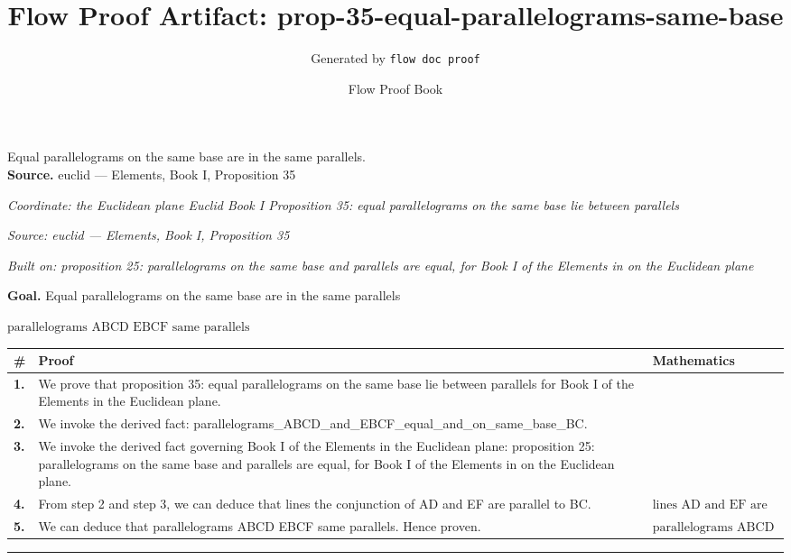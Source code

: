 \documentclass[11pt]{article}
\title{Flow Proof Artifact: prop-35-equal-parallelograms-same-base}
\author{Generated by \texttt{flow doc proof}}
\date{Flow Proof Book}
\theoremstyle{definition}
\begin{document}
\maketitle
Equal parallelograms on the same base are in the same parallels.\\[0.5em]
\textbf{Source.} euclid — Elements, Book I, Proposition 35\\[0.5em]
\bigskip
{}\par
\smallskip\noindent\textit{Coordinate: the Euclidean plane \cdot Euclid Book I \cdot Proposition 35: equal parallelograms on the same base lie between parallels}\par
\smallskip\noindent\textit{Source: euclid — Elements, Book I, Proposition 35}\par
\smallskip\noindent\textit{Built on: proposition 25: parallelograms on the same base and parallels are equal, for Book I of the Elements in on the Euclidean plane}\par
\medskip
\noindent\textbf{Goal.} Equal parallelograms on the same base are in the same parallels\par
\noindent$\displaystyle \text{parallelograms ABCD EBCF same parallels}$\par
\medskip
\noindent
\begin{tabular}{@{} >{\raggedright\arraybackslash}p{} >{\raggedright\arraybackslash}p{} >{\raggedleft\arraybackslash}p{} @{}}
\textbf{\#} & \textbf{Proof} & \textbf{Mathematics} \\
\midrule
\textbf{1.} & We prove that proposition 35: equal parallelograms on the same base lie between parallels for Book I of the Elements in the Euclidean plane. & \\[0.45em]
\textbf{2.} & We invoke the derived fact: parallelograms\_ABCD\_and\_EBCF\_equal\_and\_on\_same\_base\_BC. & \\[0.45em]
\textbf{3.} & We invoke the derived fact governing Book I of the Elements in the Euclidean plane: proposition 25: parallelograms on the same base and parallels are equal, for Book I of the Elements in on the Euclidean plane. & \\[0.45em]
\textbf{4.} & From step 2 and step 3, we can deduce that lines the conjunction of AD and EF are parallel to BC. & $\displaystyle \text{lines AD and EF are parallel to BC}$ \\[0.45em]
\textbf{5.} & We can deduce that parallelograms ABCD EBCF same parallels. Hence proven. & $\displaystyle \text{parallelograms ABCD EBCF same parallels}$ \\[0.45em]
\bottomrule
\end{tabular}
\label{thm:Geometry-Euclid Book I-proposition_35_equal_parallelograms_on_the_same_base_lie_between_parallels}
\par\medskip\hrule
\end{document}

